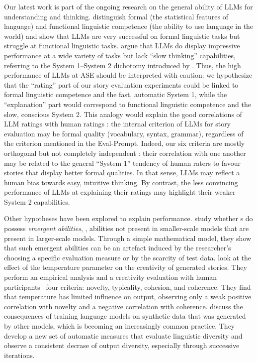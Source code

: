 Our latest work is part of the ongoing research on the general ability of LLMs for understanding and thinking. \citet{mahowald2023dissociating} distinguish formal (the statistical features of language) and functional linguistic competence (the ability to use language in the world) and show that LLMs are very successful on formal linguistic tasks but struggle at functional linguistic tasks. \citet{bubeck2023sparks} argue that LLMs do display impressive performance at a wide variety of tasks but lack ``slow thinking'' capabilities, referring to the System 1--System 2 dichotomy introduced by \citet{kahneman2011thinking}. Thus, the high performance of LLMs at ASE should be interpreted with caution: we hypothesize that the ``rating'' part of our story evaluation experiments could be linked to formal linguistic competence and the fast, automatic System 1, while the ``explanation'' part would correspond to functional linguistic competence and the slow, conscious System 2. This analogy would explain the good correlations of LLM ratings with human ratings : the internal criterion of LLMs for story evaluation may be formal quality (vocabulary, syntax, grammar), regardless of the criterion mentioned in the Eval-Prompt. Indeed, our six criteria are mostly orthogonal but not completely independent : their correlation with one another may be related to the general ``System 1'' tendency of human raters to favour stories that display better formal qualities. In that sense, LLMs may reflect a human bias towards easy, intuitive thinking. By contrast, the less convincing performance of LLMs at explaining their ratings  may highlight their weaker System 2 capabilities.

Other hypotheses have been explored to explain {\llm} performance. \citet{schaeffer2023emergent} study whether {\llm}s do possess \emph{emergent abilities}, {\ie}, abilities not present in smaller-scale models that are present in larger-scale models. Through a simple mathematical model, they show that such emergent abilities can be an artefact induced by the researcher's choosing a specific evaluation measure or by the scarcity of test data. \citet{peeperkorn2024temperature} look at the effect of the temperature parameter on the creativity of generated stories. They perform an empirical analysis and a creativity evaluation with human participants {\wrt}\ four criteria: novelty, typicality, cohesion, and coherence. They find that temperature has limited influence on {\llm} output, observing only a weak positive correlation with novelty and a negative correlation with coherence. \citet{guo-etal-2024-curious} discuss the consequences of training language models on synthetic data that was generated by other models, which is becoming an increasingly common practice. They develop a new set of automatic measures that evaluate linguistic diversity and observe a consistent decrase of output diversity, especially through successive iterations.

